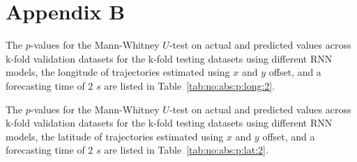 \appendix
\section{Appendix B}
\label{appB}

The $p$-values for the Mann-Whitney $U$-test on actual and predicted values across k-fold validation datasets for the k-fold testing datasets using different RNN models, the longitude of trajectories estimated using $x$ and $y$ offset, and a forecasting time of $2$ $s$ are listed in Table~\ref{tab:no:abs:p:long:2}.

\begin{table}[!ht]
	\centering
	\caption{The $p$-values for the Mann-Whitney $U$-test on actual and predicted values across k-fold validation datasets for the k-fold testing datasets using different RNN models, the longitude of trajectories estimated using $x$ and $y$ offset, and a forecasting time of $2$ $s$.}
	\label{tab:no:abs:p:long:2}
\end{table}

The $p$-values for the Mann-Whitney $U$-test on actual and predicted values across k-fold validation datasets for the k-fold testing datasets using different RNN models, the latitude of trajectories estimated using $x$ and $y$ offset, and a forecasting time of $2$ $s$ are listed in Table~\ref{tab:no:abs:p:lat:2}.

